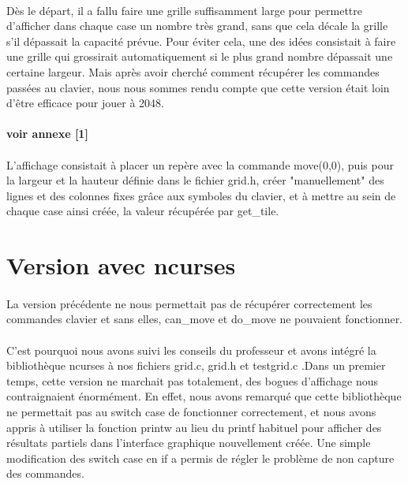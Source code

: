 \documentclass{report}
\begin{document}
\paragraph{}
Dès le départ, il a fallu faire une grille suffisamment large pour permettre d'afficher dans chaque case un nombre très grand, sans que cela décale la grille s'il dépassait la capacité prévue.
Pour éviter cela, une des idées consistait à faire une grille qui grossirait automatiquement si le plus grand nombre dépassait une certaine largeur. Mais après avoir cherché comment récupérer les commandes passées au clavier, nous nous sommes rendu compte que cette version était loin d'être efficace pour jouer à 2048. 
\paragraph{voir annexe [1]}

\paragraph{}L'affichage consistait à placer un repère avec la commande move(0,0), puis pour la largeur et la hauteur définie dans le fichier grid.h, créer "manuellement" des lignes et des colonnes fixes grâce aux symboles du clavier, et à mettre au sein de chaque case ainsi créée, la valeur récupérée par get{\_}tile.

\section{Version avec ncurses}

\paragraph{}
La version précédente ne nous permettait pas de récupérer correctement les commandes clavier et sans elles, can{\_}move et do{\_}move ne pouvaient fonctionner.
\paragraph{}
C'est pourquoi nous avons suivi les conseils du professeur et avons intégré la bibliothèque ncurses à nos fichiers grid.c, grid.h et testgrid.c .Dans un premier temps, cette version ne marchait pas totalement, des bogues d'affichage nous contraignaient énormément. En effet, nous avons remarqué que cette bibliothèque ne permettait pas au switch case de fonctionner correctement, et nous avons appris à utiliser la fonction printw au lieu du printf habituel pour afficher des résultats partiels dans l'interface graphique nouvellement créée. Une simple modification des switch case en if a permis de régler le problème de non capture des commandes.
\end{document}
